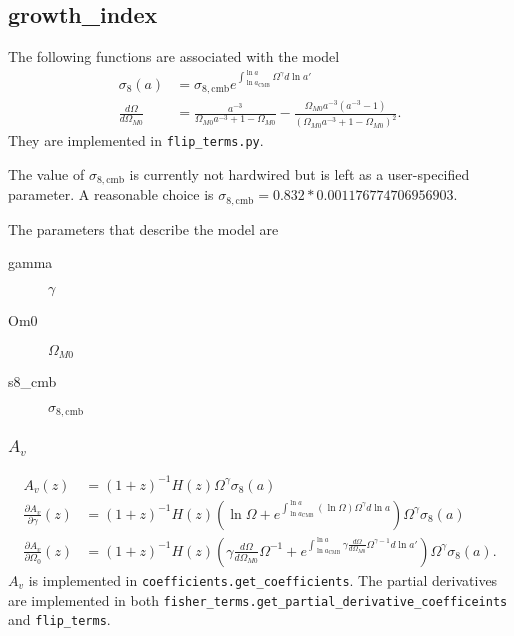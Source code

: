 \documentclass{article}
\begin{document}
\subsection{growth\_index}
The following functions are associated with the model
\begin{align}
\sigma_8(a) & = \sigma_{8,\text{cmb}}  e^{\int^{\ln{a}}_{\ln{a_\text{CMB}}} \Omega^\gamma d\ln{a'}} \\
\frac{d\Omega}{d\Omega_{M0}} & = \frac{a^{-3}}{\Omega_{M0} a^{-3} + 1 - \Omega_{M0}} - \frac{\Omega_{M0} a^{-3}(a^{-3}-1)}{(\Omega_{M0} a^{-3} + 1 - \Omega_{M0})^2}.
\end{align}
They are implemented in {\tt flip\_terms.py}.

The value of $ \sigma_{8,\text{cmb}}$ is currently not hardwired but is left as a user-specified parameter.
  A reasonable choice is $ \sigma_{8,\text{cmb}} = 0.832 * 0.001176774706956903$.

The parameters that describe the model are 
\begin{description}
\item[gamma] $\gamma$
\item[Om0] $\Omega_{M0}$
\item[s8\_cmb]  $\sigma_{8,\text{cmb}}$
\end{description}

\subsubsection{$A_v$}

\begin{align}
A_{v}(z) & = (1+z)^{-1} H(z) \Omega^\gamma  \sigma_8(a) \\
\frac{\partial A_{v}}{\partial \gamma} (z) & = (1+z)^{-1} H(z)
\left( \ln{\Omega}   + 
 e^{\int^{\ln{a}}_{\ln{a_\text{CMB}}}\left( \ln{\Omega} \right) \Omega^\gamma d\ln{a}}
\right) \Omega^\gamma  \sigma_8(a) \\
\frac{\partial A_{v}}{\partial \Omega_0} (z) & = (1+z)^{-1} H(z) 
\left( \gamma  \frac{d\Omega}{d\Omega_{M0}} \Omega^{-1}  + 
 e^{\int^{\ln{a}}_{\ln{a_\text{CMB}}}\gamma \frac{d\Omega}{d\Omega_{M0}} \Omega^{\gamma-1} d\ln{a'}}
\right) \Omega^\gamma  \sigma_8(a).
\end{align}
$A_v$ is implemented in {\tt coefficients.get_coefficients}.
The partial derivatives are implemented in both {\tt fisher_terms.get\_partial\_derivative\_coefficeints} and {\tt flip\_terms}.
\end{document}
